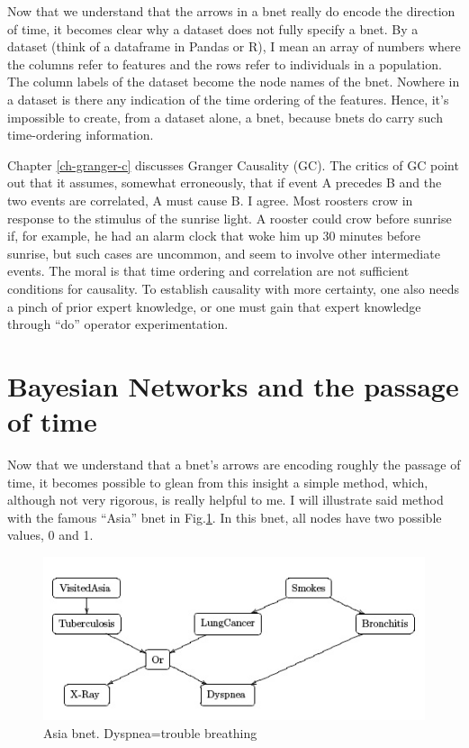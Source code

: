 Now that we understand that the arrows in a bnet really do encode the
direction of time, it becomes clear why a dataset does not fully specify a
bnet. By a dataset (think of a dataframe in Pandas or R), I mean an array of
numbers where the columns refer to features and the rows refer to individuals
in a population. The column labels of the dataset become the node names of
the bnet. Nowhere in a dataset is there any indication of the time ordering
of the features. Hence, it’s impossible to create, from a dataset alone, a
bnet, because bnets do carry such time-ordering information.

Chapter \ref{ch-granger-c} discusses
 Granger Causality
(GC). The critics of GC point out that it assumes, somewhat erroneously,
that if event A precedes B and the two events are correlated, A must
cause B. I agree. Most roosters crow in response to the stimulus of the
sunrise light.  A rooster could crow before sunrise if,  for example,  he
had an alarm clock that woke him up 30 minutes before sunrise, but such cases
are uncommon, and seem to involve other intermediate events.  The moral is
that time ordering and correlation are not sufficient
conditions for causality. To establish causality with more certainty, one
also needs a pinch of prior expert knowledge, or one must gain that expert
knowledge through ``do” operator experimentation.



\section{Bayesian Networks and the passage of time}

Now that we understand that a bnet’s arrows are encoding roughly the passage
of time, it becomes possible to glean from this insight a simple method,
which, although not very rigorous, is really helpful to me. I will illustrate
said method with the famous ``Asia” bnet in Fig.\ref{fig-asia}.
 In this bnet, all nodes
have two  possible values, 0 and 1.

\begin{figure}[h!]
\centering
\includegraphics[width=5in]
{bnets-time/asia.jpg}
\caption{Asia bnet. Dyspnea=trouble breathing}
\label{fig-asia}
\end{figure}


